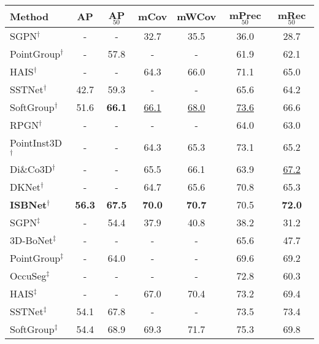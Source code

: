 \documentclass[10pt,twocolumn,letterpaper]{article}
\def\Approach{ISBNet}
\begin{document}
\begin{table}
\small
\setlength{\tabcolsep}{1.4pt}
\centering
\begin{tabular}{lcccccc}
\toprule
\textbf{Method}  & \textbf{AP}     & \textbf{AP$_{50}$} & \textbf{mCov}    & \textbf{mWCov} & \textbf{mPrec$_{50}$} & \textbf{mRec$_{50}$} \\ 
\midrule
SGPN$^{\dagger}$ \cite{yi2019gspn} & - & - & 32.7 & 35.5 & 36.0 & 28.7\\
PointGroup$^{\dagger}$ \cite{jiang2020pointgroup} & - & 57.8 & - & - & 61.9 & 62.1 \\
HAIS$^{\dagger}$ \cite{chen2021hierarchical} & - & - & 64.3 & 66.0 & 71.1 & 65.0 \\ 
SSTNet$^{\dagger}$ \cite{liang2021instance} & 42.7 & 59.3 & - & - & 65.6 & 64.2 \\
SoftGroup$^{\dagger}$ \cite{vu2022softgroup} & 51.6 & \textbf{66.1} & \underline{66.1} & \underline{68.0} & \underline{73.6} & 66.6 \\
RPGN$^{\dagger}$ \cite{dong2022rpgn} & - & - & - & - & 64.0 & 63.0 \\
PointInst3D$^{\dagger}$ \cite{He2022PointInst3DS3} & - & - & 64.3 & 65.3 & 73.1 & 65.2 \\
Di\&Co3D$^{\dagger}$ \cite{zhao2022divide} & - & - & 65.5 & 66.1 & 63.9 & \underline{67.2} \\
DKNet$^{\dagger}$ \cite{wu2022dknet} & - & - & 64.7 & 65.6 & 70.8 & 65.3\\
\midrule
\textbf{\Approach}$^{\dagger}$         & \textbf{56.3} & \textbf{67.5} & \textbf{70.0} & \textbf{70.7} & 70.5 & \textbf{72.0} \\
\bottomrule
\toprule
SGPN$^{\ddagger}$ \cite{yi2019gspn} & - & 54.4 & 37.9 & 40.8 & 38.2 & 31.2 \\
3D-BoNet$^{\ddagger}$ \cite{yang2019learning} & - & - & - & - & 65.6 & 47.7  \\
PointGroup$^{\ddagger}$ \cite{jiang2020pointgroup} & - & 64.0 & - & - & 69.6 & 69.2 \\
OccuSeg$^{\ddagger}$ \cite{han2020occuseg} & - & - & - & - & 72.8 & 60.3\\
HAIS$^{\ddagger}$ \cite{chen2021hierarchical} & - & - & 67.0 & 70.4 & 73.2 & 69.4 \\ 
SSTNet$^{\ddagger}$ \cite{liang2021instance} & 54.1 & 67.8 & - & - & 73.5 & 73.4 \\
SoftGroup$^{\ddagger}$ \cite{vu2022softgroup} & 54.4 & 68.9 & 69.3 & 71.7 & 75.3 & 69.8 \\

\end{tabular}
\end{table}
\end{document}
